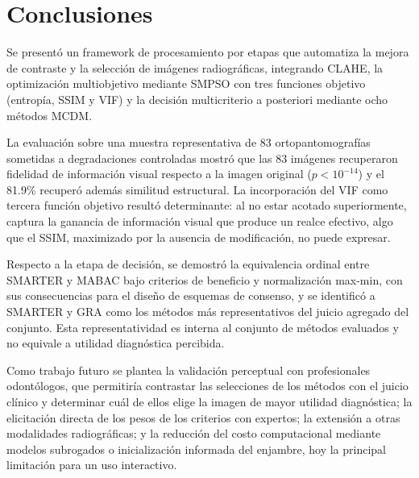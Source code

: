 \documentclass[sigplan,screen]{acmart}
\begin{document}
\section{Conclusiones}
\label{sec:conclusiones}

Se presentó un framework de procesamiento por etapas que automatiza la mejora de contraste y la selección de imágenes radiográficas, integrando CLAHE, la optimización multiobjetivo mediante SMPSO con tres funciones objetivo (entropía, SSIM y VIF) y la decisión multicriterio a posteriori mediante ocho métodos MCDM.

La evaluación sobre una muestra representativa de 83 ortopantomografías sometidas a degradaciones controladas mostró que las 83 imágenes recuperaron fidelidad de información visual respecto a la imagen original ($p<10^{-14}$) y el 81.9\% recuperó además similitud estructural. La incorporación del VIF como tercera función objetivo resultó determinante: al no estar acotado superiormente, captura la ganancia de información visual que produce un realce efectivo, algo que el SSIM, maximizado por la ausencia de modificación, no puede expresar.

Respecto a la etapa de decisión, se demostró la equivalencia ordinal entre SMARTER y MABAC bajo criterios de beneficio y normalización max-min, con sus consecuencias para el diseño de esquemas de consenso, y se identificó a SMARTER y GRA como los métodos más representativos del juicio agregado del conjunto. Esta representatividad es interna al conjunto de métodos evaluados y no equivale a utilidad diagnóstica percibida.

Como trabajo futuro se plantea la validación perceptual con profesionales odontólogos, que permitiría contrastar las selecciones de los métodos con el juicio clínico y determinar cuál de ellos elige la imagen de mayor utilidad diagnóstica; la elicitación directa de los pesos de los criterios con expertos; la extensión a otras modalidades radiográficas; y la reducción del costo computacional mediante modelos subrogados o inicialización informada del enjambre, hoy la principal limitación para un uso interactivo.

\begin{acks}
\end{acks}



\end{document}
